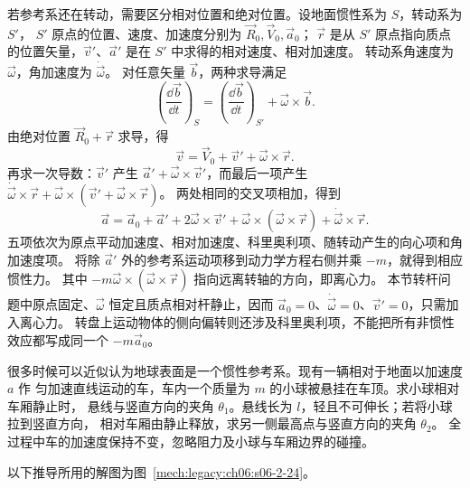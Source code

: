 {若参考系还在转动，需要区分相对位置和绝对位置。设地面惯性系为 $S$，转动系为 $S'$，
$S'$ 原点的位置、速度、加速度分别为 $\vec R_0,\vec V_0,\vec a_0$；
$\vec r$ 是从 $S'$ 原点指向质点的位置矢量，$\vec v'$、$\vec a'$ 是在 $S'$ 中求得的相对速度、相对加速度。
转动系角速度为 $\vec\omega$，角加速度为 $\dot{\vec\omega}$。
对任意矢量 $\vec b$，两种求导满足
\[
 \left(\frac{\dd\vec b}{\dd t}\right)_S
 =\left(\frac{\dd\vec b}{\dd t}\right)_{S'}+\vec\omega\times\vec b.
\]
由绝对位置 $\vec R_0+\vec r$ 求导，得
\[
 \vec v=\vec V_0+\vec v'+\vec\omega\times\vec r.
\]
再求一次导数：$\vec v'$ 产生 $\vec a'+\vec\omega\times\vec v'$，而最后一项产生
$\dot{\vec\omega}\times\vec r+\vec\omega\times(\vec v'+\vec\omega\times\vec r)$。
两处相同的交叉项相加，得到
\begin{equation}
 \vec a=\vec a_0+\vec a'+2\vec\omega\times\vec v'
 +\vec\omega\times(\vec\omega\times\vec r)
 +\dot{\vec\omega}\times\vec r.
\end{equation}
五项依次为原点平动加速度、相对加速度、科里奥利项、随转动产生的向心项和角加速度项。
将除 $\vec a'$ 外的参考系运动项移到动力学方程右侧并乘 $-m$，就得到相应惯性力。
其中 $-m\vec\omega\times(\vec\omega\times\vec r)$ 指向远离转轴的方向，即离心力。
本节转杆问题中原点固定、$\vec\omega$ 恒定且质点相对杆静止，因而
$\vec a_0=0$、$\dot{\vec\omega}=0$、$\vec v'=0$，只需加入离心力。
转盘上运动物体的侧向偏转则还涉及科里奥利项，不能把所有非惯性效应都写成同一个 $-m\vec a_0$。


\begin{origexamplebox}{}\label{ch06:ex:s06-2-24}
很多时候可以近似认为地球表面是一个惯性参考系。现有一辆相对于地面以加速度 $a$ 作
匀加速直线运动的车，车内一个质量为 $m$ 的小球被悬挂在车顶。求小球相对车厢静止时，
悬线与竖直方向的夹角 $\theta_1$。悬线长为 $l$，轻且不可伸长；若将小球拉到竖直方向，
相对车厢由静止释放，求另一侧最高点与竖直方向的夹角 $\theta_2$。
全过程中车的加速度保持不变，忽略阻力及小球与车厢边界的碰撞。
\probdiagTwoTwentyFour
\end{origexamplebox}

\begin{xesolution}
以下推导所用的解图为图~\ref{mech:legacy:ch06:s06-2-24}。


\end{xesolution}}
